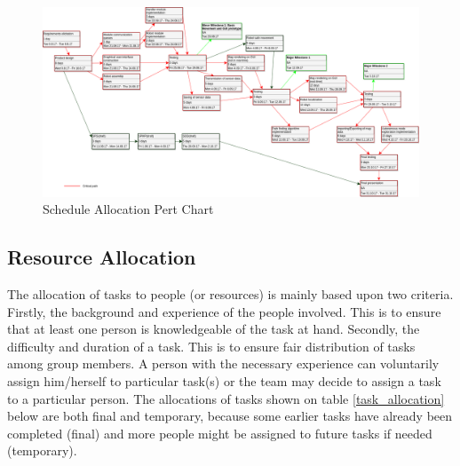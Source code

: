 \documentclass[12pt,a4paper]{article}
\begin{document}
	\begin{figure}[h!t]
    	\caption{Schedule Allocation Pert Chart}
		\label{fig:sched1}
		\centering
		\includegraphics[scale=0.38, angle=90]{sched_allo_chart}
	\end{figure}
    
	\subsection{Resource Allocation}
	The allocation of tasks to people (or resources) is mainly based upon two criteria. Firstly, the background and experience of the people involved. This is to ensure that at least one person is knowledgeable of the task at hand. Secondly, the difficulty and duration of a task. This is to ensure fair distribution of tasks among group members. A person with the necessary experience can voluntarily assign him/herself to particular task(s) or the team may decide to assign a task to a particular person. The allocations of tasks shown on table \ref{task_allocation} below are both final and temporary, because some earlier tasks have already been completed (final) and more people might be assigned to future tasks if needed (temporary).
	
\end{document}
